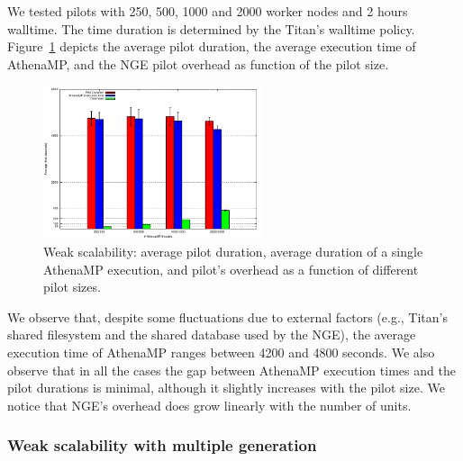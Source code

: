We tested %
pilots %
with 250, 500, 1000 and 2000 worker nodes and
2 hours walltime. The time duration is determined by the Titan's walltime policy. Figure~\ref{fig:weakScal1a} depicts the average pilot
duration, the average execution time of AthenaMP, and the NGE pilot overhead as
function of the pilot size.

\begin{figure}[!htb]
        \includegraphics[height=4.5cm,width=\columnwidth]{./figures/NGE/weak1.pdf}
    \caption{Weak scalability: average pilot duration, average  duration of a
    single AthenaMP execution, and pilot's overhead as a function of different pilot sizes. }
\label{fig:weakScal1a}
\end{figure}

We %
observe that, despite some fluctuations due to external factors
(e.g., Titan's shared filesystem and the shared database used by the NGE), the
average execution time of AthenaMP %
ranges between 4200 and 4800 seconds. %
We %
also observe that in all the cases the gap between AthenaMP execution times and
the pilot durations is minimal, although it slightly increases with the pilot
size. %
We %
notice that NGE's overhead does grow linearly with the number of units.



\subsubsection{Weak scalability with multiple generation }

